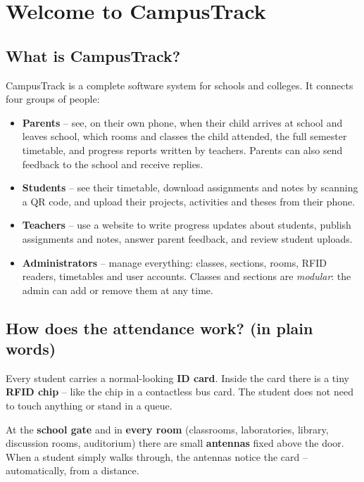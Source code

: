 \chapter{Welcome to CampusTrack}

\section{What is CampusTrack?}

CampusTrack is a complete software system for schools and colleges. It
connects four groups of people:

\begin{itemize}[itemsep=2pt]
  \item \textbf{Parents} -- see, on their own phone, when their child
        arrives at school and leaves school, which rooms and classes the
        child attended, the full semester timetable, and progress
        reports written by teachers. Parents can also send feedback to
        the school and receive replies.
  \item \textbf{Students} -- see their timetable, download assignments
        and notes by scanning a QR code, and upload their projects,
        activities and theses from their phone.
  \item \textbf{Teachers} -- use a website to write progress updates
        about students, publish assignments and notes, answer parent
        feedback, and review student uploads.
  \item \textbf{Administrators} -- manage everything: classes, sections,
        rooms, RFID readers, timetables and user accounts. Classes and
        sections are \emph{modular}: the admin can add or remove them at
        any time.
\end{itemize}

\section{How does the attendance work? (in plain words)}

Every student carries a normal-looking \textbf{ID card}. Inside the card
there is a tiny \textbf{RFID chip} -- like the chip in a contactless bus
card. The student does not need to touch anything or stand in a queue.

At the \textbf{school gate} and in \textbf{every room} (classrooms,
laboratories, library, discussion rooms, auditorium) there are small
\textbf{antennas} fixed above the door. When a student simply walks
through, the antennas notice the card -- automatically, from a distance.

